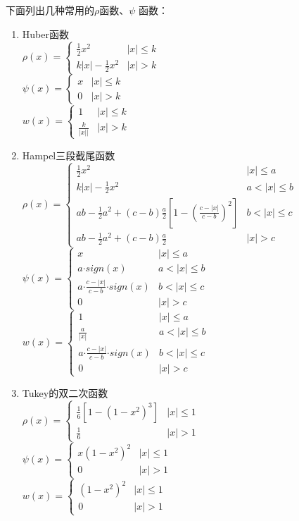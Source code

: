 \documentclass[english]{article}\usepackage[]{graphicx}\usepackage[]{color}
\begin{document}
下面列出几种常用的$\rho$函数、$\psi$ 函数：
\begin{enumerate}
\item Huber函数\\
$\rho(x)=\begin{cases}
\frac{1}{2}x^{2} & |x|\leq k\\
k|x|-\frac{1}{2}x^{2} & |x|>k
\end{cases}$\\
$\psi(x)=\begin{cases}
x & |x|\leq k\\
0 & |x|>k
\end{cases}$\\
$w(x)=\begin{cases}
1 & |x|\leq k\\
\frac{k}{|x||} & |x|>k
\end{cases}$
\item Hampel三段截尾函数\\
$\rho(x)=\begin{cases}
\frac{1}{2}x^{2} & |x|\leq a\\
k|x|-\frac{1}{2}x^{2} & a<|x|\leq b\\
ab-\frac{1}{2}a^{2}+\left(c-b\right)\frac{a}{2}\left[1-\left(\frac{c-|x|}{c-b}\right)^{2}\right] & b<|x|\leq c\\
ab-\frac{1}{2}a^{2}+\left(c-b\right)\frac{a}{2} & |x|>c
\end{cases}$\\
$\psi(x)=\begin{cases}
x & |x|\leq a\\
a\text{·}sign(x) & a<|x|\leq b\\
a\text{·}\frac{c-|x|}{c-b}\text{·}sign(x) & b<|x|\leq c\\
0 & |x|>c
\end{cases}$\\
$w(x)=\begin{cases}
1 & |x|\leq a\\
\frac{a}{|x|} & a<|x|\leq b\\
a\text{·}\frac{c-|x|}{c-b}\text{·}sign(x) & b<|x|\leq c\\
0 & |x|>c
\end{cases}$
\item Tukey的双二次函数\\
$\rho(x)=\begin{cases}
\frac{1}{6}\left[1-\left(1-x^{2}\right)^{3}\right] & |x|\leq1\\
\frac{1}{6} & |x|>1
\end{cases}$\\
$\psi(x)=\begin{cases}
x\left(1-x^{2}\right)^{2} & |x|\leq1\\
0 & |x|>1
\end{cases}$\\
$w(x)=\begin{cases}
\left(1-x^{2}\right)^{2} & |x|\leq1\\
0 & |x|>1
\end{cases}$
\end{enumerate}
\end{document}
